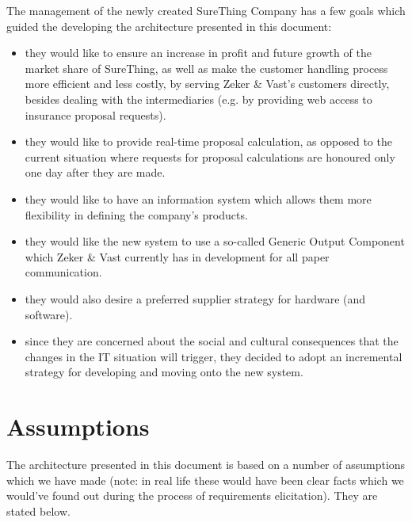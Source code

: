 The management of the newly created SureThing Company has a few goals
which guided the developing the architecture presented in this document:

\begin{itemize}
\item they would like to ensure an increase in profit and future growth
of the market share of SureThing, as well as make the customer handling
process more efficient and less costly, by serving Zeker \& Vast's customers
directly, besides dealing with the intermediaries (e.g. by providing web access
to insurance proposal requests).
\item they would like to provide real-time proposal calculation, as opposed
to the current situation where requests for proposal calculations are honoured
only one day after they are made.
\item they would like to have an information system which allows them
more flexibility in defining the company's products.
\item they would like the new system to use a so-called Generic Output Component
which Zeker \& Vast currently has in development for all paper communication.
\item they would also desire a preferred supplier strategy for hardware (and
software).
\item since they are concerned about the social and cultural consequences that the
changes in the IT situation will trigger, they decided to adopt an incremental strategy
for developing and moving onto the new system.
\end{itemize}

\section{Assumptions}

The architecture presented in this document is based on a number of assumptions
which we have made (note: in real life these would have been clear facts which
we would've found out during the process of requirements elicitation). They are stated
below.

